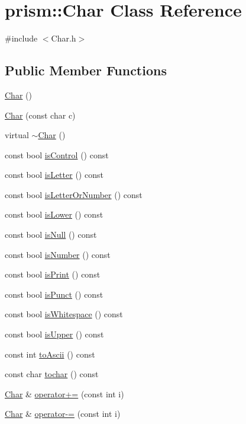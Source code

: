 \hypertarget{classprism_1_1_char}{}\section{prism\+:\+:Char Class Reference}
\label{classprism_1_1_char}


{\ttfamily \#include $<$Char.\+h$>$}

\subsection*{Public Member Functions}
\begin{DoxyCompactItemize}
\item 
\hyperlink{classprism_1_1_char_ae5e69d2f43f9c357cd2abcbf96c835cb}{Char} ()
\item 
\hyperlink{classprism_1_1_char_ad3d23a1b70477b29e1ffdfe8c0c6ac73}{Char} (const char c)
\item 
virtual \hyperlink{classprism_1_1_char_a380f6e37b5bf3ccd5a370ba5fd1b49df}{$\sim$\+Char} ()
\item 
const bool \hyperlink{classprism_1_1_char_a55142ba6fb3b81b089bae99a010db8a7}{is\+Control} () const 
\item 
const bool \hyperlink{classprism_1_1_char_a588ec1d5a5f8533ff6ec7664b93978dc}{is\+Letter} () const 
\item 
const bool \hyperlink{classprism_1_1_char_adfd1a3e0892573b4f7259e1985807fb7}{is\+Letter\+Or\+Number} () const 
\item 
const bool \hyperlink{classprism_1_1_char_af79d4d532aff44db259852b28fdb8890}{is\+Lower} () const 
\item 
const bool \hyperlink{classprism_1_1_char_a9869d8f45403bf30072bfd6d8b7374f1}{is\+Null} () const 
\item 
const bool \hyperlink{classprism_1_1_char_aae5ca384e263d56a9c0dfcc22707e24a}{is\+Number} () const 
\item 
const bool \hyperlink{classprism_1_1_char_aaaf4ddff3e581eb615c134bc59fc6950}{is\+Print} () const 
\item 
const bool \hyperlink{classprism_1_1_char_a573352d2881fc11c90eb0a19b98f0325}{is\+Punct} () const 
\item 
const bool \hyperlink{classprism_1_1_char_a734f3cebcb96e155e9d120a416f7bf74}{is\+Whitespace} () const 
\item 
const bool \hyperlink{classprism_1_1_char_a6f51555989b72ca424a515a5fb6471a9}{is\+Upper} () const 
\item 
const int \hyperlink{classprism_1_1_char_a26d719979d33ddc420591eb92fbf3bfc}{to\+Ascii} () const 
\item 
const char \hyperlink{classprism_1_1_char_aefd335b68105adc4a7904b5f6bdd6d3e}{tochar} () const 
\item 
\hyperlink{classprism_1_1_char}{Char} \& \hyperlink{classprism_1_1_char_ac55fb85b00dfabeaf52171c9cb6f09cf}{operator+=} (const int i)
\item 
\hyperlink{classprism_1_1_char}{Char} \& \hyperlink{classprism_1_1_char_a3366825c859912a25832f244eeeceb46}{operator-\/=} (const int i)
\end{DoxyCompactItemize}
